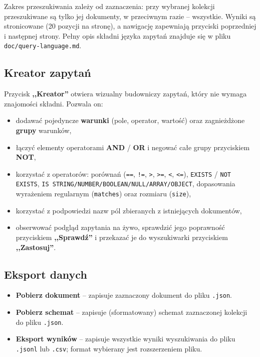 \documentclass[a4paper,12pt]{article}
\begin{document}
Zakres przeszukiwania zależy od zaznaczenia: przy wybranej kolekcji przeszukiwane są
tylko jej dokumenty, w przeciwnym razie -- wszystkie. Wyniki są stronicowane
(20 pozycji na stronę), a nawigację zapewniają przyciski poprzedniej i następnej
strony. Pełny opis składni języka zapytań znajduje się
w pliku \texttt{doc/query-language.md}.

\subsection{Kreator zapytań}

Przycisk \textbf{,,Kreator''} otwiera wizualny budowniczy zapytań, który nie wymaga
znajomości składni. Pozwala on:

\begin{itemize}[noitemsep]
  \item dodawać pojedyncze \textbf{warunki} (pole, operator, wartość) oraz zagnieżdżone
        \textbf{grupy} warunków,
  \item łączyć elementy operatorami \textbf{AND} / \textbf{OR} i negować całe grupy
        przyciskiem \textbf{NOT},
  \item korzystać z operatorów: porównań (\texttt{==}, \texttt{!=}, \texttt{>},
        \texttt{>=}, \texttt{<}, \texttt{<=}), \texttt{EXISTS} / \texttt{NOT EXISTS},
        \texttt{IS STRING/NUMBER/BOOLEAN/NULL/ARRAY/OBJECT}, dopasowania wyrażeniem
        regularnym (\texttt{matches}) oraz rozmiaru (\texttt{size}),
  \item korzystać z podpowiedzi nazw pól zbieranych z istniejących dokumentów,
  \item obserwować podgląd zapytania na żywo, sprawdzić jego poprawność przyciskiem
        \textbf{,,Sprawdź''} i przekazać je do wyszukiwarki przyciskiem
        \textbf{,,Zastosuj''}.
\end{itemize}

\subsection{Eksport danych}

\begin{itemize}[noitemsep]
  \item \textbf{Pobierz dokument} -- zapisuje zaznaczony dokument do pliku \texttt{.json}.
  \item \textbf{Pobierz schemat} -- zapisuje (sformatowany) schemat zaznaczonej kolekcji
        do pliku \texttt{.json}.
  \item \textbf{Eksport wyników} -- zapisuje wszystkie wyniki wyszukiwania do pliku
        \texttt{.jsonl} lub \texttt{.csv}; format wybierany jest rozszerzeniem pliku.
\end{itemize}
\end{document}
